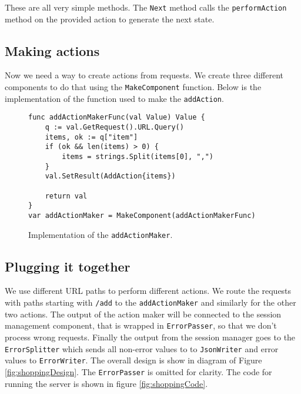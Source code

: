 \documentclass[12pt,a4paper]{article}
\begin{document}
These are all very simple methods. The \texttt{Next} method calls 
the \texttt{performAction} method on the provided action to generate 
the next state.

\subsection{Making actions}
Now we need a way to create actions from requests. We create three different
components to do that using the \texttt{MakeComponent} function. Below
is the implementation of the function used to make the \texttt{addAction}.
\begin{figure}[h]
\begin{lstlisting}
func addActionMakerFunc(val Value) Value {
    q := val.GetRequest().URL.Query()
    items, ok := q["item"]
    if (ok && len(items) > 0) {
        items = strings.Split(items[0], ",")
    }
    val.SetResult(AddAction{items})
    
    return val
}
var addActionMaker = MakeComponent(addActionMakerFunc) 
\end{lstlisting}
\caption[scale=1.0]{Implementation of the \texttt{addActionMaker}.}
\label{fig:addActionMaker}
\end{figure}

\subsection{Plugging it together}
We use different URL paths to perform different actions. We route the 
requests with paths starting with \texttt{/add} to the \texttt{addActionMaker}
and similarly for the other two actions. The output of the action maker
will be connected to the session management component, that is wrapped in
\texttt{ErrorPasser}, so that we don't process wrong requests.
Finally the output from the session manager goes to the \texttt{ErrorSplitter}
which sends all non-error values to to \texttt{JsonWriter} and error
values to \texttt{ErrorWriter}. The overall design is show in diagram 
of Figure \ref{fig:shoppingDesign}. The \texttt{ErrorPasser} is omitted 
for clarity. The code for running the server is shown in figure 
\ref{fig:shoppingCode}.
\end{document}
